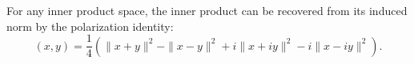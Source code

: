 For any inner product space, the inner product can be recovered from its induced norm by the polarization identity:
$$
(x,y) = \frac{1}{4}\left( \|x + y\|^2 - \|x - y\|^2 + i \|x + iy\|^2 - i \|x - iy\|^2 \right).
$$

